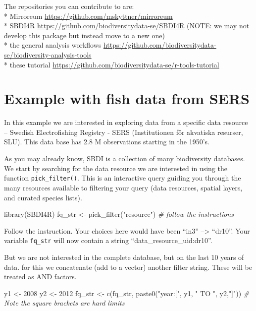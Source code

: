 \documentclass[
  10pt,
]{article}
\newenvironment{Shaded}{\begin{snugshade}}{\end{snugshade}}
\newcommand{\CommentTok}[1]{\textcolor[rgb]{0.56,0.35,0.01}{\textit{#1}}}
\newcommand{\DecValTok}[1]{\textcolor[rgb]{0.00,0.00,0.81}{#1}}
\newcommand{\FunctionTok}[1]{\textcolor[rgb]{0.00,0.00,0.00}{#1}}
\newcommand{\NormalTok}[1]{#1}
\newcommand{\OtherTok}[1]{\textcolor[rgb]{0.56,0.35,0.01}{#1}}
\newcommand{\StringTok}[1]{\textcolor[rgb]{0.31,0.60,0.02}{#1}}
\begin{document}
The repositories you can contribute to are:\\
* Mirroreum \url{https://github.com/mskyttner/mirroreum}\\
* SBDI4R \url{https://github.com/biodiversitydata-se/SBDI4R} (NOTE: we may not develop this package but instead move to a new one)\\
* the general analysis workflows \url{https://github.com/biodiversitydata-se/biodiversity-analysis-tools}\\
* these tutorial \url{https://github.com/biodiversitydata-se/r-tools-tutorial}

\hypertarget{example-with-fish-data-from-sers}{%
\section{Example with fish data from SERS}\label{example-with-fish-data-from-sers}}

In this example we are interested in exploring data from a specific data resource -- Swedish Electrofishing Registry - SERS (Institutionen för akvatiska resurser, SLU). This data base has 2.8 M observations starting in the 1950's.

As you may already know, SBDI is a collection of many biodiversity databases. We start by searching for the data resource we are interested in using the function \texttt{pick\_filter()}. This is an interactive query guiding you through the many resources available to filtering your query (data resources, spatial layers, and curated species lists).

\begin{Shaded}
\begin{Highlighting}[]
\FunctionTok{library}\NormalTok{(SBDI4R)}
\NormalTok{fq\_str }\OtherTok{\textless{}{-}} \FunctionTok{pick\_filter}\NormalTok{(}\StringTok{"resource"}\NormalTok{) }
\CommentTok{\# follow the instructions }
\end{Highlighting}
\end{Shaded}

Follow the instruction. Your choices here would have been ``in3'' --\textgreater{} ``dr10''. Your variable \texttt{fq\_str} will now contain a string ``data\_resource\_uid:dr10''.

But we are not interested in the complete database, but on the last 10 years of data. for this we concatenate (add to a vector) another filter string. These will be treated as AND factors.

\begin{Shaded}
\begin{Highlighting}[]
\NormalTok{y1 }\OtherTok{\textless{}{-}} \DecValTok{2008}
\NormalTok{y2 }\OtherTok{\textless{}{-}} \DecValTok{2012}
\NormalTok{fq\_str }\OtherTok{\textless{}{-}} \FunctionTok{c}\NormalTok{(fq\_str, }\FunctionTok{paste0}\NormalTok{(}\StringTok{"year:["}\NormalTok{, y1, }\StringTok{" TO "}\NormalTok{, y2,}\StringTok{"]"}\NormalTok{))}
\CommentTok{\# Note the square brackets are hard limits}
\end{Highlighting}
\end{Shaded}
\end{document}
